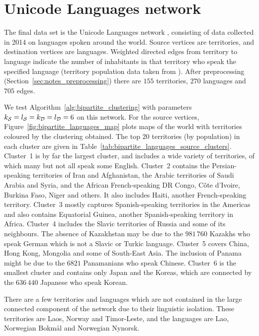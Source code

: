 \section{Unicode Languages network} \label{sec:bipartite_languages}

The final data set is the Unicode Languages network \cite{konect:unicodelang}, consisting of data collected in 2014 on languages spoken around the world.
Source vertices are territories, and destination vertices are languages.
Weighted directed edges from territory to language indicate the number of inhabitants in that territory who speak the specified language (territory population data taken from \cite{geonames}).
After preprocessing (Section~\ref{sec:notes_preprocessing}) there are $155$ territories, $270$ languages and $705$ edges.

We test Algorithm~\ref{alg:bipartite_clustering} with parameters $k_{\mathcal{S}} = l_{\mathcal{S}} = k_{\mathcal{D}} = l_{\mathcal{D}} = 6$ on this network.
For the source vertices, Figure~\ref{fig:bipartite_languages_map} plots maps of the world with territories coloured by the clustering obtained. The top 20 territories (by population) in each cluster are given in Table~\ref{tab:bipartite_languages_source_clusters}. 
Cluster~1 is by far the largest cluster, and includes a wide variety of territories, of which many but not all speak some English.
Cluster~2 contains the Persian-speaking territories of Iran and Afghanistan, the Arabic territories of Saudi Arabia and Syria, and the African French-speaking DR Congo, C\^ote d'Ivoire, Burkina Faso, Niger and others. It also includes Haiti, another French-speaking territory.
Cluster~3 mostly captures Spanish-speaking territories in the Americas and also contains Equatorial Guinea, another Spanish-speaking territory in Africa.
Cluster~4 includes the Slavic territories of Russia and some of its neighbours. The absence of Kazakhstan may be due to the $981 \, 760$ Kazakhs who speak German which is not a Slavic or Turkic language.
Cluster~5 covers China, Hong Kong, Mongolia and some of South-East Asia. The inclusion of Panama might be due to the $6821$ Panamanians who speak Chinese.
Cluster~6 is the smallest cluster and contains only Japan and the Koreas, which are connected by the $636 \, 440$ Japanese who speak Korean.

There are a few territories and languages which are not contained in the large connected component of the network due to their linguistic isolation. These territories are Laos, Norway and Timor-Leste, and the languages are Lao, Norwegian Bokm{\aa}l and Norwegian Nynorsk.



